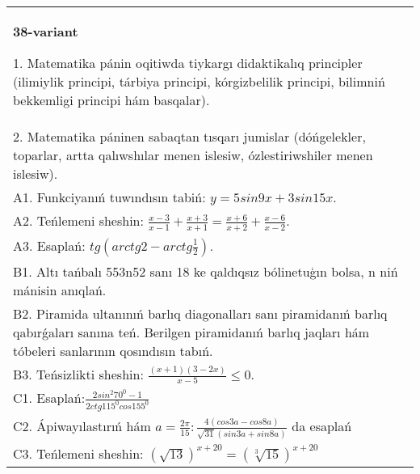 \documentclass{article}
\begin{document}
\begin{tabular}{m{17cm}}
\textbf{38-variant}

1. Matematika pánin oqitiwda tiykargı didaktikalıq principler (ilimiylik principi, tárbiya principi, kórgizbelilik principi, bilimniń bekkemligi principi hám basqalar). \\
2. Matematika páninen sabaqtan tısqarı jumislar (dóńgelekler, toparlar, artta qalıwshılar menen islesiw, ózlestiriwshiler menen islesiw). \\
A1. Funkciyanıń tuwındısın tabiń: \(y = 5 sin 9x + 3 sin 15x\). \\
A2. Teńlemeni sheshin: \(\frac{x - 3}{x - 1} + \frac{x + 3}{x + 1} = \frac{x + 6}{x + 2} + \frac{x - 6}{x - 2}\). \\
A3. Esaplań: \(tg\left(arctg2 - arctg\frac{1}{2} \right) \). \\
B1. Altı tańbalı 553n52 sanı 18 ke qaldıqsız bólinetuģın bolsa, n niń mánisin anıqlań. \\
B2. Piramida ultanınıń barlıq diagonalları sanı piramidanıń barlıq qabırǵaları sanına teń. Berilgen piramidanıń barlıq jaqları hám tóbeleri sanlarının qosındısın tabıń. \\
B3. Teńsizlikti sheshin: \(\frac{ (x + 1) (3 - 2x) }{x - 5} \leq 0\). \\
C1. Esaplań:\(\frac{2sin^{2}70^{0} - 1}{2ctg115^{0}cos155^{0}}\) \\
C2. Ápiwayılastırıń hám \(a = \frac{2\pi}{15}:\frac{4 (cos3a - cos8a) }{\sqrt{31} (sin3a + sin8a) }\) da esaplań \\
C3. Teńlemeni sheshin: \((\sqrt{13}) ^{x + 20} = (\sqrt[3]{15}) ^{x + 20}\) \\

\end{tabular}
\vspace{1cm}
\end{document}

